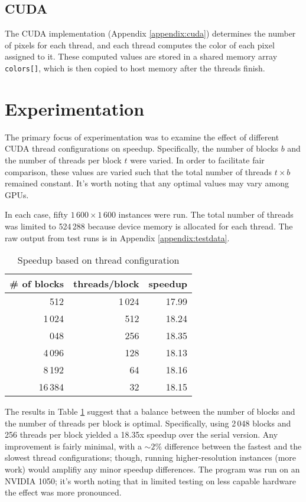 \documentclass{article}
\begin{document}
    \subsection{CUDA}
        The CUDA implementation (Appendix \ref{appendix:cuda}) determines the number of pixels for each thread, and each thread computes the color of each pixel assigned to it. These computed values are stored in a shared memory array \verb|colors[]|, which is then copied to host memory after the threads finish.

\section{Experimentation}
    The primary focus of experimentation was to examine the effect of different CUDA thread configurations on speedup. Specifically, the number of blocks $b$ and the number of threads per block $t$ were varied. In order to facilitate fair comparison, these values are varied such that the total number of threads $t \times b$ remained constant. It's worth noting that any optimal values may vary among GPUs.

    In each case, fifty $1\,600 \times 1\,600$ instances were run. The total number of threads was limited to 524\,288 because device memory is allocated for each thread. The raw output from test runs is in Appendix \ref{appendix:testdata}.

    \def\boxit#1{%
      \smash{\fboxsep=0pt\llap{\rlap{\fbox{\strut\makebox[#1]{}}}~}}\ignorespaces
    }

    \renewcommand{\arraystretch}{1.5}
    \begin{table}[h]
    \centering
    \caption{Speedup based on thread configuration}
    \begin{tabular}{r | r || r}\label{tab:speedup}
    \# of blocks & threads/block & speedup \\ \hline
    512                 & 1\,024    & 17.99 \\
    1\,024              & 512       & 18.24 \\
    \boxit{150pt}2\,048 & 256       & 18.35 \\
    4\,096              & 128       & 18.13 \\
    8\,192              & 64        & 18.16 \\
    16\,384             & 32        & 18.15
    \end{tabular}
    \end{table}

    The results in Table \ref{tab:speedup} suggest that a balance between the number of blocks and the number of threads per block is optimal. Specifically, using 2\,048 blocks and 256 threads per block yielded a 18.35x speedup over the serial version. Any improvement is fairly minimal, with a $\sim 2\%$ difference between the fastest and the slowest thread configurations; though, running higher-resolution instances (more work) would amplifiy any minor speedup differences. The program was run on an NVIDIA 1050; it's worth noting that in limited testing on less capable hardware the effect was more pronounced.
\end{document}
